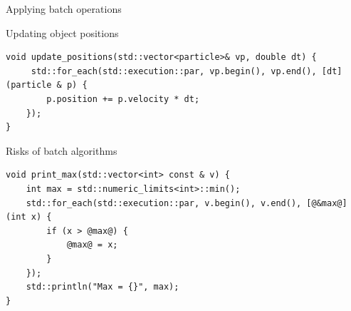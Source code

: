 \begin{frame}[t,fragile]{Applying batch operations}
\begin{block}{Updating object positions}
\begin{lstlisting}
void update_positions(std::vector<particle>& vp, double dt) {
     std::for_each(std::execution::par, vp.begin(), vp.end(), [dt](particle & p) {
        p.position += p.velocity * dt;
    });
}
\end{lstlisting}
\end{block}

\begin{block}{Risks of batch algorithms}
\begin{lstlisting}
void print_max(std::vector<int> const & v) {
    int max = std::numeric_limits<int>::min();
    std::for_each(std::execution::par, v.begin(), v.end(), [@&max@](int x) {
        if (x > @max@) {
            @max@ = x;
        }
    });
    std::println("Max = {}", max);
}
\end{lstlisting}
\end{block}
\end{frame}